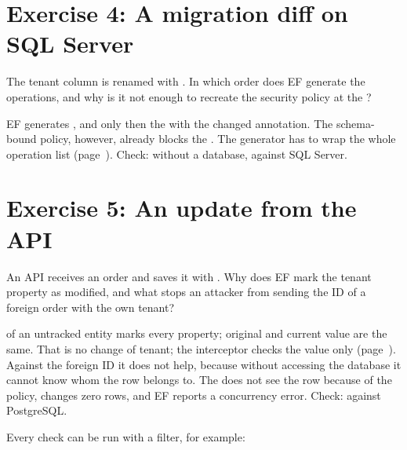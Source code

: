 \section{Exercise 4: A migration diff on SQL Server}

The tenant column is renamed with
.
In which order does EF generate the operations, and why is it not enough to recreate the security
policy at the ?

\begin{note}[Solution]
  EF generates ,  and only then the
   with the changed annotation. The
  schema-bound policy, however, already blocks the . The generator
  has to wrap the whole operation list
  (page~\pageref{sec:sqlserver-schema-bound-changes}).
  Check: 
  without a database, 
  against SQL Server.
\end{note}

\section{Exercise 5: An update from the API}

An API receives an order and saves it with . Why does EF mark the tenant property as
modified, and what stops an attacker from sending the ID of a foreign order with the own tenant?

\begin{note}[Solution]
   of an untracked entity marks every property; original and current value are the
  same. That is no change of tenant; the interceptor checks the value only
  (page~\pageref{sec:tracking-flag-versus-value}). Against the foreign ID it does not help,
  because without accessing the database it cannot know whom the row belongs to. The
   does not see the row because of the policy, changes zero rows, and EF reports a
  concurrency error. Check:  against
  PostgreSQL.
\end{note}

Every check can be run with a filter, for example:

